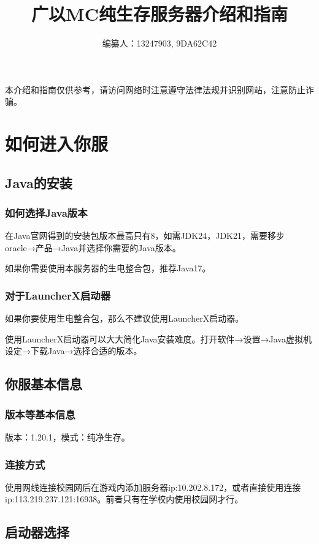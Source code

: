 \documentclass[UTF8,a4paper]{article}
\title{广以MC纯生存服务器介绍和指南}
\author{编纂人：13247903, 9DA62C42}
\begin{document}
	\maketitle
	\tableofcontents
	\newpage
	\par 本介绍和指南仅供参考，请访问网络时注意遵守法律法规并识别网站，注意防止诈骗。
	\section{如何进入你服}
		\subsection{Java的安装}
			\subsubsection{如何选择Java版本}
				\par 在Java官网得到的安装包版本最高只有8，如需JDK24，JDK21，需要移步oracle→产品→Java并选择你需要的Java版本。
				\par 如果你需要使用本服务器的生电整合包，推荐Java17。
			\subsubsection{对于LauncherX启动器}
				\par 如果你要使用生电整合包，那么不建议使用LauncherX启动器。
				\par 使用LauncherX启动器可以大大简化Java安装难度。打开软件→设置→Java虚拟机设定→下载Java→选择合适的版本。
		\subsection{你服基本信息}
			\subsubsection{版本等基本信息}
				\par 版本：1.20.1，模式：纯净生存。
			\subsubsection{连接方式}
				\par 使用网线连接校园网后在游戏内添加服务器ip:10.202.8.172，或者直接使用连接ip:113.219.237.121:16938。前者只有在学校内使用校园网才行。
		\subsection{启动器选择}
\end{document}
